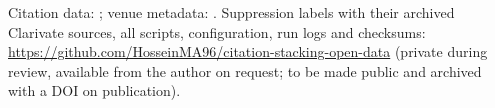 Citation data: \citet{arjomandi2024dataset}; venue metadata: \citet{ocmeta2024dump}. Suppression labels with their
archived Clarivate sources, all scripts, configuration, run logs and checksums: \url{https://github.com/HosseinMA96/citation-stacking-open-data} (private during review, available
from the author on request; to be made public and archived with a DOI on publication).
